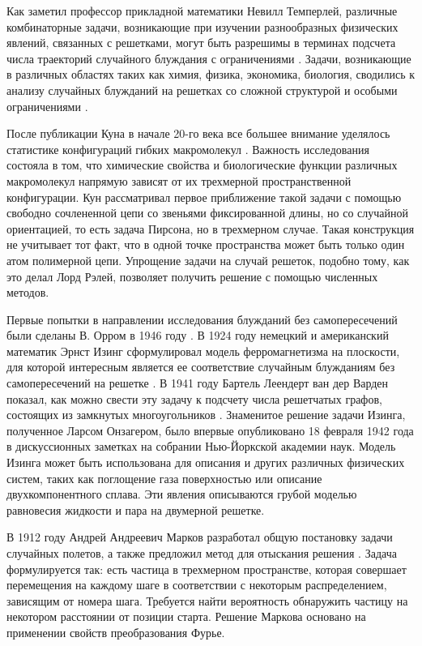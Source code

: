 Как заметил профессор прикладной математики Невилл Темперлей, различные комбинаторные задачи, возникающие при изучении разнообразных физических явлений, связанных с решетками, могут быть разрешимы в терминах подсчета числа траекторий случайного блуждания с ограничениями \cite{temperley_combinatorial_1956}. Задачи, возникающие в различных областях таких как химия, физика, экономика, биология, сводились к анализу случайных блужданий на решетках со сложной структурой и особыми ограничениями \cite{kuhn_uber_1930, flory_principles_1953, gee_interaction_1946, ising_beitrag_1925, tricomi_funzioni_1954}. 

После публикации Куна в начале 20-го века все большее внимание уделялось статистике конфигураций гибких макромолекул \cite{kuhn_uber_1930}. Важность исследования состояла в том, что химические свойства и биологические функции различных макромолекул напрямую зависят от их трехмерной пространственной конфигурации. Кун рассматривал первое приближение такой задачи с помощью свободно сочлененной цепи со звеньями фиксированной длины, но со случайной ориентацией, то есть задача Пирсона, но в трехмерном случае. Такая конструкция не учитывает тот факт, что в одной точке пространства может быть только один атом полимерной цепи. Упрощение задачи на случай решеток, подобно тому, как это делал Лорд Рэлей, позволяет получить решение с помощью численных методов.

Первые попытки в направлении исследования блужданий без самопересечений были сделаны В. Орром в 1946 году \cite{gee_interaction_1946}. В 1924 году немецкий и американский математик Эрнст Изинг сформулировал модель ферромагнетизма на плоскости, для которой интересным является ее соответствие случайным блужданиям без самопересечений на решетке \cite{ising_beitrag_1925}. В 1941 году Бартель Леендерт ван дер Варден показал, как можно свести эту задачу к подсчету числа решетчатых графов, состоящих из замкнутых многоугольников \cite{van_der_waerden_lange_1941}. Знаменитое решение задачи Изинга, полученное Ларсом Онзагером, было впервые опубликовано 18 февраля 1942 года в дискуссионных заметках на собрании Нью-Йоркской академии наук. Модель Изинга может быть использована для описания и других различных физических систем, таких как поглощение газа поверхностью или описание двухкомпонентного сплава. Эти явления описываются грубой моделью равновесия жидкости и пара на двумерной решетке.

В 1912 году Андрей Андреевич Марков разработал общую постановку задачи случайных полетов, а также предложил метод для отыскания решения \cite{markov_wahrscheinlichkeitsrechnung_1912}. Задача формулируется так: есть частица в трехмерном пространстве, которая совершает перемещения на каждому шаге в соответствии с некоторым распределением, зависящим от номера шага. Требуется найти вероятность обнаружить частицу на некотором расстоянии от позиции старта. Решение Маркова основано на применении свойств преобразования Фурье.

